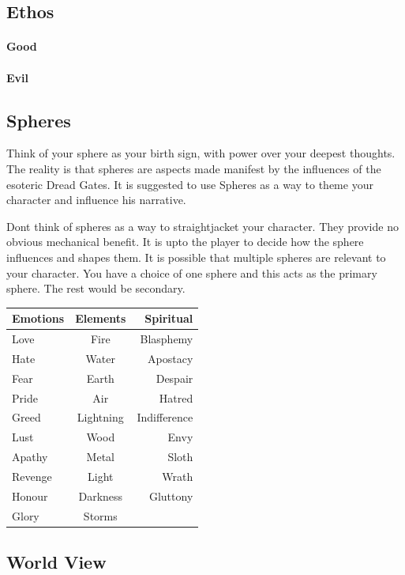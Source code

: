 \begin{multicols}{2}


\subsection{Ethos}
\paragraph{Good}
\paragraph{Evil}
\subsection{Spheres}
Think of your sphere as your birth sign, with power over your deepest thoughts. The reality is that spheres are aspects made manifest by the influences of the esoteric Dread Gates. It is suggested to use Spheres as a way to theme your character and influence his narrative. 

Dont think of spheres as a way to straightjacket your character. They provide no obvious mechanical benefit. It is upto the player to decide how the sphere influences and shapes them. It is possible that multiple spheres are relevant to your character. You have a choice of one sphere and this acts as the primary sphere. The rest would be secondary. 

\begin{tabular}{l|c|r}
    Emotions & Elements & Spiritual \\
    \hline
    Love & Fire & Blasphemy\\
    Hate & Water & Apostacy\\
    Fear & Earth & Despair\\
    Pride & Air & Hatred\\
    Greed & Lightning & Indifference\\
    Lust & Wood & Envy\\
    Apathy & Metal & Sloth\\
    Revenge & Light & Wrath\\
    Honour & Darkness & Gluttony\\
    Glory & Storms & \\
\end{tabular}

\subsection{World View}

\end{multicols}
